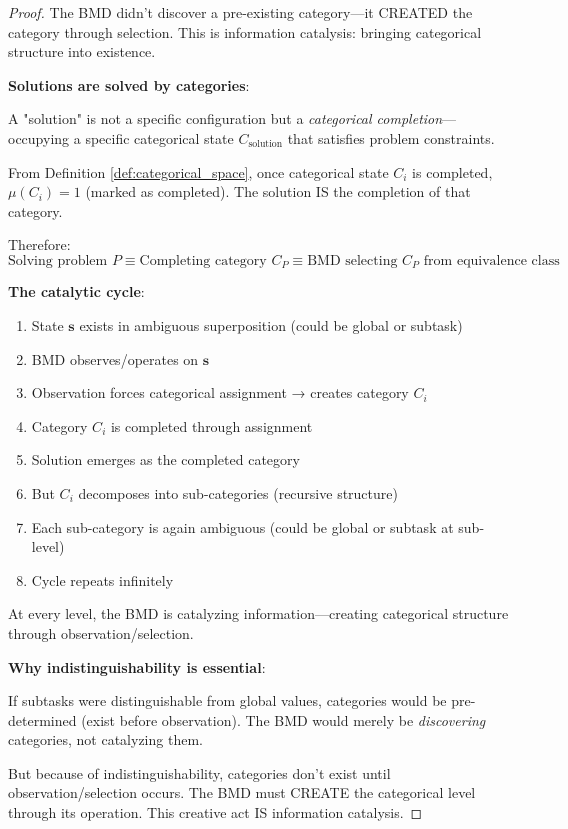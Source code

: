 \documentclass[12pt,a4paper]{article}
\begin{document}
\begin{proof}
The BMD didn't discover a pre-existing category—it CREATED the category through selection. This is information catalysis: bringing categorical structure into existence.

\textbf{Solutions are solved by categories}:

A "solution" is not a specific configuration but a \textit{categorical completion}—occupying a specific categorical state $C_{\text{solution}}$ that satisfies problem constraints.

From Definition \ref{def:categorical_space}, once categorical state $C_i$ is completed, $\mu(C_i) = 1$ (marked as completed). The solution IS the completion of that category.

Therefore:
\begin{equation}
\text{Solving problem } P \equiv \text{Completing category } C_{P} \equiv \text{BMD selecting } C_P \text{ from equivalence class}
\end{equation}

\textbf{The catalytic cycle}:

\begin{enumerate}
\item State $\mathbf{s}$ exists in ambiguous superposition (could be global or subtask)
\item BMD observes/operates on $\mathbf{s}$
\item Observation forces categorical assignment → creates category $C_i$
\item Category $C_i$ is completed through assignment
\item Solution emerges as the completed category
\item But $C_i$ decomposes into sub-categories (recursive structure)
\item Each sub-category is again ambiguous (could be global or subtask at sub-level)
\item Cycle repeats infinitely
\end{enumerate}

At every level, the BMD is catalyzing information—creating categorical structure through observation/selection.

\textbf{Why indistinguishability is essential}:

If subtasks were distinguishable from global values, categories would be pre-determined (exist before observation). The BMD would merely be \textit{discovering} categories, not catalyzing them.

But because of indistinguishability, categories don't exist until observation/selection occurs. The BMD must CREATE the categorical level through its operation. This creative act IS information catalysis.


\end{proof}
\end{document}
